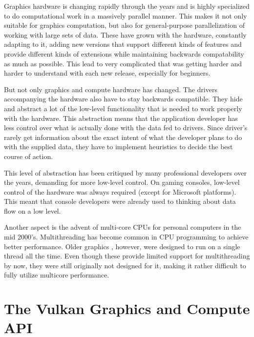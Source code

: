     Graphics hardware is changing rapidly through the years and is highly specialized to do computational work in a massively parallel manner. This makes it not only suitable for graphics computation, but also for general-purpose parallelization of working with large sets of data. These  have grown with the hardware, constantly adapting to it, adding new versions that support different kinds of features and provide different kinds of extensions while maintaining backwards compatability as much as possible. This lead to very complicated  that was getting harder and harder to understand with each new release, especially for beginners.

    But not only graphics and compute hardware has changed. The drivers accompanying the hardware also have to stay backwards compatible. They hide and abstract a lot of the low-level functionality that is needed to work properly with the hardware. This abstraction means that the application developer has less control over what is actually done with the data fed to drivers. Since driver's rarely get information about the exact intent of what the developer plans to do with the supplied data, they have to implement heuristics to decide the best course of action.

    This level of abstraction has been critiqued by many professional developers over the years, demanding for more low-level control. On gaming consoles, low-level control of the hardware was always required (except for Microsoft platforms). This meant that console developers were already used to thinking about data flow on a low level.

    Another aspect is the advent of multi-core CPUs for personal computers in the mid 2000's. Multithreading has become common in CPU programming to achieve better performance. Older graphics , however, were designed to run on a single thread all the time. Even though these  provide limited support for multithreading by now, they were still originally not designed for it, making it rather difficult to fully utilize multicore performance.



  \section{The Vulkan Graphics and Compute API}

